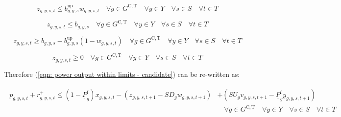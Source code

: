 \documentclass{article}
\newcommand{\sGeneratorsCandidateThermal}{G^{\mathrm{C,T}}}
\newcommand{\sYears}{Y}
\newcommand{\sScenarios}{S}
\newcommand{\sIntervals}{T}
\newcommand{\iGenerator}{g}
\newcommand{\iYear}{y}
\newcommand{\iScenario}{s}
\newcommand{\iInterval}{t}
\newcommand{\cPowerOutputMin}[1][\iGenerator]{\underline{P}_{#1}}
\newcommand{\cPowerOutputMinProportion}{\cPowerOutputMin^{\mathrm{f}}}
\newcommand{\cRampRateStartup}[1][\iGenerator]{SU_{#1}}
\newcommand{\cRampRateShutdown}[1][\iGenerator]{SD_{#1}}
\newcommand{\vStartupIndicator}[1][\iGenerator,\iYear,\iScenario,\iInterval]{v_{#1}}
\newcommand{\vShutdownIndicator}[1][\iGenerator,\iYear,\iScenario,\iInterval]{w_{#1}}
\newcommand{\vReserveUp}[1][\iGenerator,\iYear,\iScenario,\iInterval]{r^{+}_{#1}}
\newcommand{\vPower}[1][\iGenerator,\iYear,\iScenario,\iInterval]{p_{#1}}
\newcommand{\vInstalledCapacityTotalScenario}[1][\iGenerator,\iYear,\iScenario]{b_{#1}}
\newcommand{\vInstalledCapacityOnStateAux}[1][\iGenerator,\iYear,\iScenario,\iInterval]{x_{#1}}
\newcommand{\vInstalledCapacityStartupStateAux}[1][\iGenerator,\iYear,\iScenario,\iInterval]{y_{#1}}
\newcommand{\vInstalledCapacityShutdownStateAux}[1][\iGenerator,\iYear,\iScenario,\iInterval]{z_{#1}}
\begin{document}
\begin{equation}
\vInstalledCapacityShutdownStateAux \leq \vInstalledCapacityTotalScenario^{\mathrm{up}} \vShutdownIndicator \quad \forall \iGenerator \in \sGeneratorsCandidateThermal \quad \forall \iYear \in \sYears \quad \forall \iScenario \in \sScenarios \quad \forall \iInterval \in \sIntervals
\label{eqn: shutdown state aux variable block start}
\end{equation}

\begin{equation}
\vInstalledCapacityShutdownStateAux \leq \vInstalledCapacityTotalScenario \quad \forall \iGenerator \in \sGeneratorsCandidateThermal \quad \forall \iYear \in \sYears \quad \forall \iScenario \in \sScenarios \quad \forall \iInterval \in \sIntervals
\end{equation}

\begin{equation}
\vInstalledCapacityShutdownStateAux \geq \vInstalledCapacityTotalScenario - \vInstalledCapacityTotalScenario^{\mathrm{up}} \left(1 - \vShutdownIndicator \right) \quad \forall \iGenerator \in \sGeneratorsCandidateThermal \quad \forall \iYear \in \sYears \quad \forall \iScenario \in \sScenarios \quad \forall \iInterval \in \sIntervals
\end{equation}

\begin{equation}
\vInstalledCapacityShutdownStateAux \geq 0 \quad \forall \iGenerator \in \sGeneratorsCandidateThermal \quad \forall \iYear \in \sYears \quad \forall \iScenario \in \sScenarios \quad \forall \iInterval \in \sIntervals
\label{eqn: shutdown state aux variable block end}
\end{equation}

Therefore (\ref{eqn: power output within limits - candidate}) can be re-written as:

\begin{align}
\begin{split}
\vPower + \vReserveUp \leq \left(1 - \cPowerOutputMinProportion\right) \vInstalledCapacityOnStateAux - \left(\vInstalledCapacityShutdownStateAux[\iGenerator,\iYear,\iScenario,\iInterval+1] -\cRampRateShutdown \vShutdownIndicator[\iGenerator,\iYear,\iScenario,\iInterval+1] \right) & + \left(\cRampRateStartup \vStartupIndicator[\iGenerator,\iYear,\iScenario,\iInterval+1] - \cPowerOutputMinProportion \vInstalledCapacityStartupStateAux[\iGenerator,\iYear,\iScenario,\iInterval+1] \right)\\
& \quad \forall \iGenerator \in \sGeneratorsCandidateThermal \quad \forall \iYear \in \sYears \quad \forall \iScenario \in \sScenarios \quad \forall \iInterval \in \sIntervals\\
\end{split}
\end{align}
\end{document}
